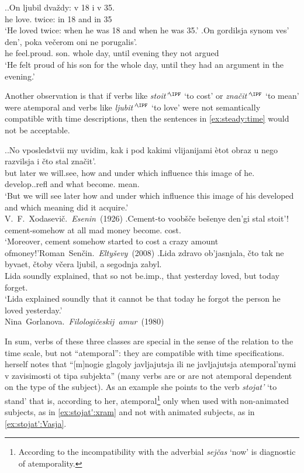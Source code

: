 \ex.\label{ex:steady:adv}\ag.On ljubil dva\v{z}dy: v 18 i v 35.\\
he love. twice: in 18 and in 35\\
\trans `He loved twice: when he was 18 and when he was 35.'
\bg.On gordilsja synom ves' den', poka ve\v{c}erom oni ne porugalis'.\\
he feel.proud. son. whole day, until evening they not argued\\
\trans `He felt proud of his son for the whole day, until they had an argument in the evening.'

Another observation is that if verbs like \textit{stoit'}$^{\IPF}$ `to cost' or \textit{zna\v{c}it'}$^{\IPF}$ `to mean' were atemporal and verbs like \textit{ljubit'$^{\IPF}$} `to love' were not semantically compatible with time descriptions, then the sentences in \ref{ex:steady:time} would not be acceptable.

\ex.\label{ex:steady:time}\ag.No vposledstvii my uvidim, kak i pod kakimi vlijanijami \`{e}tot obraz u nego razvilsja i \v{c}to stal zna\v{c}it'.\\
but later we will.see, how and under which influence this image of he. develop..refl and what become. mean.\\
\trans `But we will see later how and under which influence this image of his developed and which meaning did it acquire.'\\\hbox{}\hfill\hbox{V. F. Xodasevi\v{c}. \textit{Esenin} (1926)}
\bg.Cement-to voob\v{s}\v{c}e be\v{s}enye den'gi stal stoit'!\\
cement-somehow {at all} mad money become. cost.\\
\trans `Moreover, cement somehow started to cost a crazy amount of\linebreak money!'\hbox{}\hfill\hbox{Roman Sen\v{c}in. \textit{Elty\v{s}evy} (2008)}
\bg.Lida zdravo ob'jasnjala, \v{c}to tak ne byvaet, \v{c}toby v\v{c}era ljubil, a segodnja zabyl.\\
Lida soundly explained, that so not be.imp., that yesterday loved, but today forget.\\
\trans `Lida explained soundly that it cannot be that today he forgot the person he loved yesterday.'\\\hbox{}\hfill\hbox{Nina Gorlanova. \textit{Filologi\v{c}eskij amur} (1980)}

In sum, verbs of these three classes are special in the sense of the relation to the time scale, but not ``atemporal'': they are compatible with time specifications. \citet[132]{Paducheva:96} herself notes that ``[m]nogie glagoly javljajutsja ili ne javljajutsja atemporal'nymi v zavisimosti ot tipa subjekta'' (many verbs are or are not atemporal dependent on the type of the subject). As an example she points to the verb \textit{stojat'} `to stand' that is, according to her, atemporal\footnote{According to \citet{Paducheva:96} the incompatibility with the adverbial \textit{sej\v{c}as} `now' is diagnostic of atemporality.} only when used with non-animated subjects, as in \ref{ex:stojat':xram} and not with animated subjects, as in \ref{ex:stojat':Vasja}.

